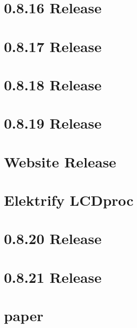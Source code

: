 \documentclass[twoside]{book}
\newcommand{\+}{\discretionary{\mbox{\scriptsize$\hookleftarrow$}}{}{}}
\begin{document}
\chapter{0.8.16 Release}
\label{doc_news_2016-04-29_0_8_16_md}

\chapter{0.8.17 Release}
\label{doc_news_2016-06-14_0_8_17_md}

\chapter{0.8.18 Release}
\label{doc_news_2016-09-17_0_8_18_md}

\chapter{0.8.19 Release}
\label{doc_news_2016-11-22_0_8_19_md}

\chapter{Website Release}
\label{doc_news_2016-12-17_website_release_md}

\chapter{Elektrify L\+C\+Dproc}
\label{doc_news_2017-03-18_lcdproc_md}

\chapter{0.8.20 Release}
\label{doc_news_2017-10-31_0_8_20_md}

\chapter{0.8.21 Release}
\label{doc_news__preparation_next_release_md}

\chapter{paper}
\label{md_doc_paper_paper}

\end{document}
